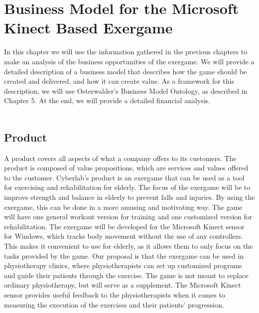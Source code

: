 \chapter{Business Model for the Microsoft Kinect Based Exergame}
In this chapter we will use the information gathered in the previous chapters to  make an analysis of the business opportunities of the exergame. We will provide a detailed description of a business model that describes how the game should be created and delivered, and how it can create value. As a framework for this description, we will use Osterwalder's Business Model Ontology, as described in Chapter 5. At the end, we will provide a detailed financial analysis. \\ \\ 
 

\section{Product}
A product covers all aspects of what a company offers to its customers. The product is composed of value propositions, which are services and values offered to the customer. Cyberlab’s product is an exergame that can be used as a tool for exercising and rehabilitation for elderly. The focus of the exergame will be to improve strength and balance in elderly to prevent falls and injuries. By using the exergame, this can be done in a more amusing and motivating way. The game will have one general workout version for training and one customized version for rehabilitation. The exergame will be developed for the Microsoft Kinect sensor for Windows, which tracks body movement without the use of any controllers. This makes it convenient to use for elderly, as it allows them to only focus on the tasks provided by the game. Our proposal is that the exergame can be used in physiotherapy clinics, where physiotherapists can set up customized programs and guide their patients through the exercise. The game is not meant to replace ordinary physiotherapy, but will serve as a supplement. The Microsoft Kinect sensor provides useful feedback to the physiotherapists when it comes to measuring the execution of the exercises and their patients' progression. 
